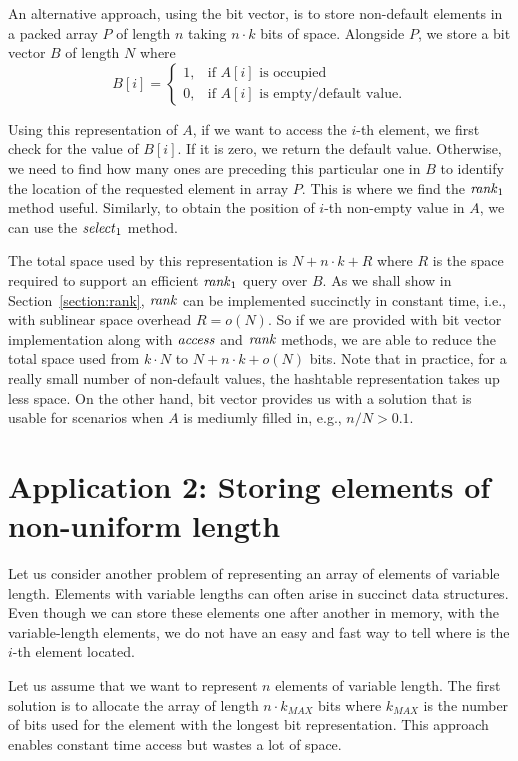 An alternative approach, using the bit vector, is to store non-default elements in
a packed array $P$ of length $n$ taking $n\cdot k$ bits of space. Alongside $P$, we
store a bit vector $B$ of length $N$ where
\[
   B[i]=
\begin{cases}
   1,& \text{if $A[i]$ is occupied} \\
   0,& \text{if $A[i]$ is empty/default value.}
\end{cases}
\]

Using this representation of $A$, if we want to access the $i$-th element, we first check for
the value of $B[i]$. If it is zero, we return the default value. Otherwise, we need to find
how many ones are preceding this particular one in $B$ to identify the location of the requested
element in array $P$. This is where we find the $\mathit{rank}_1$ method useful. Similarly, to obtain
the position of $i$-th non-empty value in $A$, we can use the $\mathit{select}_1$ method.

The total space used by this representation is $N+n\cdot k+R$ where $R$ is the space required
to support an efficient $\mathit{rank}_1$ query over $B$. As we shall show in Section~\ref{section:rank},
$\mathit{rank}$ can be implemented succinctly in constant time, i.e., with sublinear space overhead
$R = o(N)$. So if we are provided with bit vector implementation along with $\mathit{access}$ and $\mathit{rank}$
methods, we are able to reduce the total space used from $k\cdot N$ to $N+n\cdot k+o(N)$ bits.
Note that in practice, for a really small number of non-default values, the hashtable representation
takes up less space. On the other hand, bit vector provides us with a solution that is usable for
scenarios when $A$ is mediumly filled in, e.g., $n/N>0.1$.

\section{Application 2: Storing elements of non-uniform length}

Let us consider another problem of representing an array of elements of variable length.
Elements with variable lengths can often arise in succinct data structures. Even though
we can store these elements one after another in memory, with the variable-length elements,
we do not have an easy and fast way to tell where is the $i$-th element located.

Let us assume that we want to represent $n$ elements of variable length. The first solution
is to allocate the array of length $n\cdot k_{MAX}$ bits where $k_{MAX}$ is the number of
bits used for the element with the longest bit representation. This approach enables constant
time access but wastes a lot of space.


